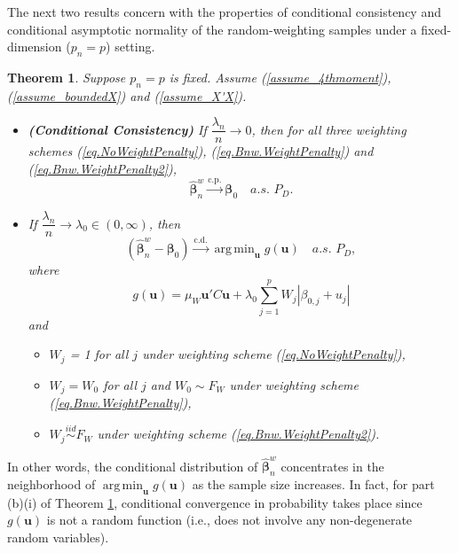 \documentclass[ejs,authoryear,linksfromyear]{imsart}
\DeclareMathOperator*{\argmin}{arg\,min} %
\newcommand{\CONV}[1]{\stackrel{\text{#1}}{\longrightarrow}} %
\newcommand{\bnw}{\widehat{\bm{\beta}}_n^w} %
\numberwithin{equation}{section}
\theoremstyle{plain}
\newtheorem{thm}{Theorem}[section]
\begin{document}
The next two results concern with the properties of conditional consistency and conditional asymptotic normality of the random-weighting samples under a fixed-dimension ($p_n = p$) setting.   

\begin{thm} \label{thm_low_Consistency}
	Suppose $p_n = p$ is fixed. Assume (\ref{assume_4thmoment}), (\ref{assume_boundedX}) and (\ref{assume_X'X}). 
	\begin{itemize}
		\item [ (a) ] \textbf{(Conditional Consistency)} If $\dfrac{\lambda_n}{n} \to 0$, then for all three weighting schemes (\ref{eq.NoWeightPenalty}), (\ref{eq.Bnw.WeightPenalty}) and (\ref{eq.Bnw.WeightPenalty2}),
		$$
		\bnw \CONV{c.p.} \bm{\beta}_0 \quad a.s. \,\, P_D.
		$$
		\item [ (b) ] 	If $\dfrac{\lambda_n}{n} \to \lambda_0 \in (0,\infty)$, then 
		$$
		\left( \bnw - \bm{\beta}_0 \right) \CONV{c.d.} 
		\argmin_{\bm{u}} g(\bm{u}) \quad a.s. \,\, P_D,
		$$
		where
		$$
		g(\bm{u}) = 
		\mu_W \bm{u}' C \bm{u} + 
		\lambda_0 \sum_{j=1}^p W_j | \beta_{0,j} + u_j | 
		$$
		and
		\begin{itemize}
			\item [(i)] $W_j$ = 1 for all $j$ under weighting scheme (\ref{eq.NoWeightPenalty}),
			\item [(ii)] $W_j = W_0$ for all $j$ and $W_0 \sim F_W$ under weighting scheme (\ref{eq.Bnw.WeightPenalty}), 
			\item [(iii)] $W_j \stackrel{iid}{\sim} F_W$ under weighting scheme (\ref{eq.Bnw.WeightPenalty2}).
		\end{itemize}
	\end{itemize} 
\end{thm}
In other words, the conditional distribution of $\bnw$ concentrates
in the neighborhood of $\argmin_{\bm{u}} g(\bm{u})$ as the sample size increases.
In fact, for part (b)(i) of Theorem \ref{thm_low_Consistency}, conditional convergence in probability takes place since $g(\bm{u})$ is not a random function (i.e., does not involve any non-degenerate random variables).
\end{document}
